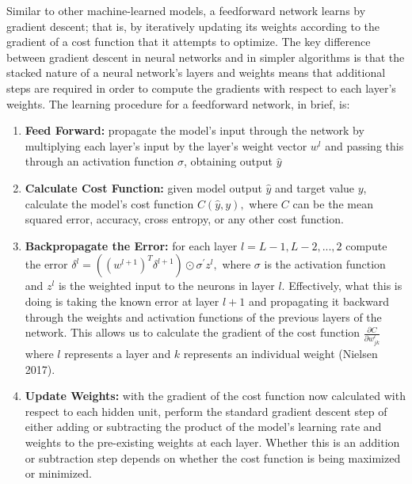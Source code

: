 \documentclass[12pt]{article}  %
\theoremstyle{definition}
\theoremstyle{remark}
\begin{document}
\par Similar to other machine-learned models, a feedforward network learns by gradient descent; that is, by iteratively updating its weights according to the gradient of a cost function that it attempts to optimize. The key difference between gradient descent in neural networks and in simpler algorithms is that the stacked nature of a neural network's layers and weights means that additional steps are required in order to compute the gradients with respect to each layer's weights. The learning procedure for a feedforward network, in brief, is: 

\begin{enumerate}[{1}]
   \item \textbf{Feed Forward:} propagate the model's input through the network by multiplying each layer's input by the layer's weight vector $w^l$ and passing this through an activation function $\sigma$, obtaining output $\hat{y}$
  
   \item \textbf{Calculate Cost Function:} given model output $\hat{y}$ and target value $y$, calculate the model's cost function $C(\hat{y}, y),$ where $C$ can be the mean squared error, accuracy, cross entropy, or any other cost function. 
 
   \item \textbf{Backpropagate the Error:} for each layer $l=L-1, L-2, ..., 2$ compute the error $\delta^{l}=((w^{l+1})^T\delta^{l+1})\odot \sigma^{\prime}z^{l},$ where $\sigma$ is the activation function and $z^l$ is the weighted input to the neurons in layer $l$. Effectively, what this is doing is taking the known error at layer $l+1$ and propagating it backward through the weights and activation functions of the previous layers of the network. This allows us to calculate the gradient of the cost function $\frac{\partial{C}}{\partial{w^{l}_{jk}}}$ where $l$ represents a layer and $k$ represents an individual weight (Nielsen 2017). 
    
   \item \textbf{Update Weights:} with the gradient of the cost function now calculated with respect to each hidden unit, perform the standard gradient descent step of either adding or subtracting the product of the model's learning rate and weights to the pre-existing weights at each layer. Whether this is an addition or subtraction step depends on whether the cost function is being maximized or minimized. 
\end{enumerate}
\end{document}
